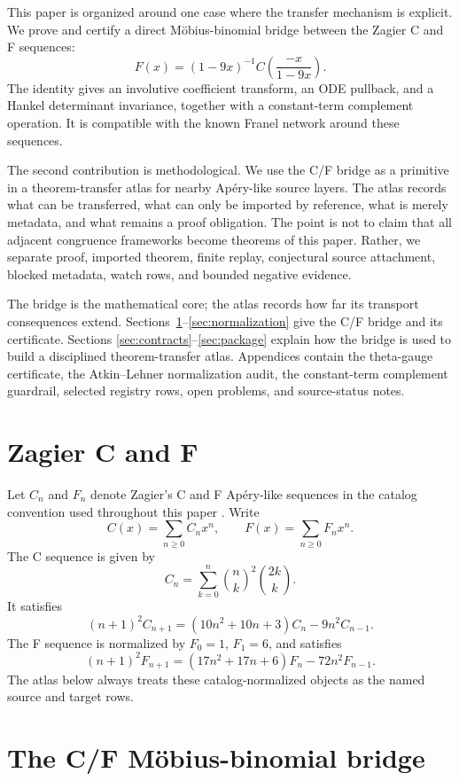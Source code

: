 \documentclass[11pt,a4paper]{article}
\begin{document}
This paper is organized around one case where the transfer mechanism is
explicit.  We prove and certify a direct M\"obius-binomial bridge between the
Zagier C and F sequences:
\[
  F(x)=(1-9x)^{-1} C\!\left(\frac{-x}{1-9x}\right).
\]
The identity gives an involutive coefficient transform, an ODE pullback, and a
Hankel determinant invariance, together with a constant-term complement
operation.  It is compatible with the known Franel network around these
sequences.

The second contribution is methodological.  We use the C/F bridge as a
primitive in a theorem-transfer atlas for nearby Ap{\'e}ry-like source layers.
The atlas records what can be transferred, what can only be imported by
reference, what is merely metadata, and what remains a proof obligation.  The
point is not to claim that all adjacent congruence frameworks become theorems
of this paper.  Rather, we separate proof, imported theorem, finite replay,
conjectural source attachment, blocked metadata, watch rows, and bounded
negative evidence.

The bridge is the mathematical core; the atlas records how far its transport
consequences extend.  Sections~\ref{sec:sequences}--\ref{sec:normalization}
give the C/F bridge and its certificate.  Sections
\ref{sec:contracts}--\ref{sec:package} explain how the bridge is used to build
a disciplined theorem-transfer atlas.  Appendices contain the theta-gauge
certificate, the Atkin--Lehner normalization audit, the constant-term
complement guardrail, selected registry rows, open problems, and source-status
notes.

\section{Zagier C and F}
\label{sec:sequences}

Let $C_n$ and $F_n$ denote Zagier's C and F Ap{\'e}ry-like sequences in the
catalog convention used throughout this paper
\cite{zagier_2009_aperylike,oeis_a002893,oeis_a093388}.  Write
\[
  C(x)=\sum_{n\geq0}C_nx^n,\qquad
  F(x)=\sum_{n\geq0}F_nx^n.
\]
The C sequence is given by
\[
  C_n=\sum_{k=0}^n\binom{n}{k}^2\binom{2k}{k}.
\]
It satisfies
\[
  (n+1)^2C_{n+1}
  =(10n^2+10n+3)C_n-9n^2C_{n-1}.
\]
The F sequence is normalized by $F_0=1$, $F_1=6$, and satisfies
\[
  (n+1)^2F_{n+1}
  =(17n^2+17n+6)F_n-72n^2F_{n-1}.
\]
The atlas below always treats these catalog-normalized objects as the named
source and target rows.

\section{The C/F M\"obius-binomial bridge}
\label{sec:bridge}
\end{document}
